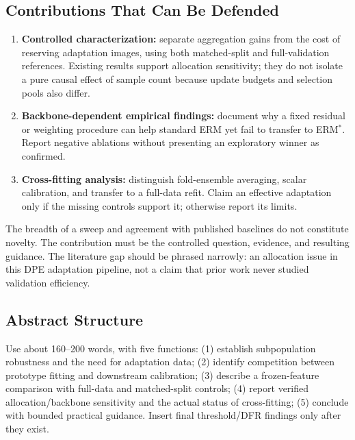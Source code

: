 \documentclass[runningheads]{llncs}
\begin{document}
\subsection{Contributions That Can Be Defended}
\begin{enumerate}
\item \textbf{Controlled characterization:} separate aggregation gains from the cost of reserving adaptation images, using both matched-split and full-validation references. Existing results support allocation sensitivity; they do not isolate a pure causal effect of sample count because update budgets and selection pools also differ.
\item \textbf{Backbone-dependent empirical findings:} document why a fixed residual or weighting procedure can help standard ERM yet fail to transfer to ERM$^*$. Report negative ablations without presenting an exploratory winner as confirmed.
\item \textbf{Cross-fitting analysis:} distinguish fold-ensemble averaging, scalar calibration, and transfer to a full-data refit. Claim an effective adaptation only if the missing controls support it; otherwise report its limits.
\end{enumerate}
The breadth of a sweep and agreement with published baselines do not constitute novelty. The contribution must be the controlled question, evidence, and resulting guidance. The literature gap should be phrased narrowly: an allocation issue in this DPE adaptation pipeline, not a claim that prior work never studied validation efficiency.

\subsection{Abstract Structure}
Use about 160--200 words, with five functions: (1) establish subpopulation robustness and the need for adaptation data; (2) identify competition between prototype fitting and downstream calibration; (3) describe a frozen-feature comparison with full-data and matched-split controls; (4) report verified allocation/backbone sensitivity and the actual status of cross-fitting; (5) conclude with bounded practical guidance. Insert final threshold/DFR findings only after they exist.
\end{document}
